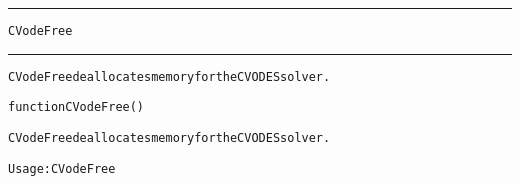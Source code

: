 \begin{samepage}
\hrule
\begin{center}
{\large \verb!CVodeFree!}
\label{p:CVodeFree}
\end{center}
\hrule\vspace{0.1in}



\begin{alltt}
CVodeFree deallocates memory for the CVODES solver.
\end{alltt}

\end{samepage}



\begin{samepage}


\begin{alltt}
function CVodeFree() 
\end{alltt}

\end{samepage}



\begin{alltt}
CVodeFree deallocates memory for the CVODES solver.

   Usage:  CVodeFree
\end{alltt}






\vspace{0.1in}